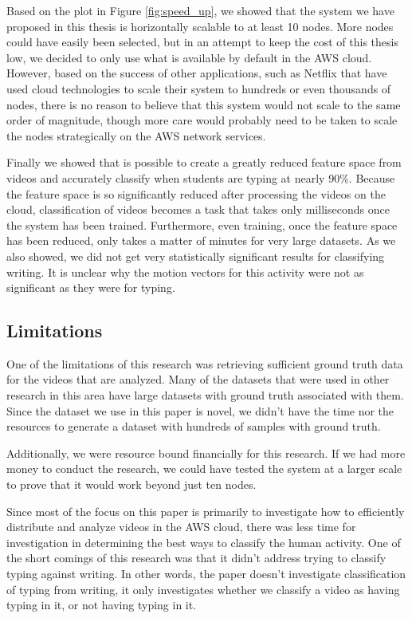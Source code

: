 Based on the plot in Figure \ref{fig:speed_up}, we showed that the system
we have proposed in this thesis is horizontally scalable to at least 10 nodes.
More nodes could have easily been selected, but in an attempt to keep the cost
of this thesis low, we decided to only use what is available by default in the
AWS cloud. However, based on the success of other applications, such as
Netflix that have used cloud technologies to scale their system to hundreds
or even thousands of nodes, there is no reason to believe that this system
would not scale to the same order of magnitude, though more care would probably
need to be taken to scale the nodes strategically on the AWS network services.

Finally we showed that is possible to create a greatly reduced feature space
from videos and accurately classify when students are typing at nearly 90\%.
Because the feature space is so significantly reduced after processing the
videos on the cloud, classification of videos becomes a task that takes only
milliseconds once the system has been trained. Furthermore, even training, once
the feature space has been reduced, only takes a matter of minutes for very
large datasets. As we also showed, we did not get very statistically significant
results for classifying writing. It is unclear why the motion vectors for this
activity were not as significant as they were for typing.

\subsection{Limitations}
One of the limitations of this research was retrieving sufficient ground truth
data for the videos that are analyzed. Many of the datasets that were
used in other research in this area have large datasets with ground truth
associated with them. Since the dataset we use in this paper is novel, we didn't
have the time nor the resources to generate a dataset with hundreds of samples
with ground truth.

Additionally, we were resource bound financially for this research. If we had more
money to conduct the research, we could have tested the system at a larger
scale to prove that it would work beyond just ten nodes.

Since most of the focus on this paper is primarily to investigate how to
efficiently distribute and analyze videos in the AWS cloud, there was less time
for investigation in determining the best ways to classify the human activity.
One of the short comings of this research was that it didn't address trying to
classify typing against writing. In other words, the paper doesn't investigate
classification of typing from writing, it only investigates whether we classify
a video as having typing in it, or not having typing in it.

